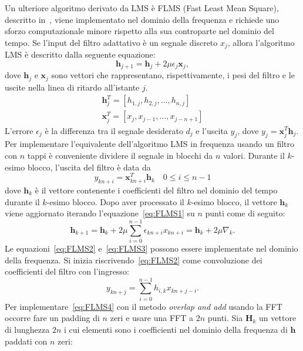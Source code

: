 \documentclass[12pt,a4paper,titlepage]{article}
\begin{document}
Un ulteriore algoritmo derivato da LMS è FLMS (Fast Least Mean Square), descritto in~\cite{Ferrara:FLMS}, viene implementato nel dominio della frequenza e richiede uno sforzo computazionale minore rispetto alla sua controparte nel dominio del tempo. Se l'input del filtro adattativo è un segnale discreto $x_j$, allora l'algoritmo LMS è descritto dalla seguente equazione:
\begin{equation}\label{eq:FLMS1}
\mathbf{h}_{j+1} = \mathbf{h}_j + 2 \mu \epsilon_j \mathbf{x}_j,
\end{equation}
dove $\mathbf{h}_j$ e $\mathbf{x}_j$ sono vettori che rappresentano, rispettivamente, i pesi del filtro e le uscite nella linea di ritardo all'istante $j$.
\begin{equation*}
\begin{split}
\mathbf{h}_j^T = [h_{1,j}, h_{2,j}, \dots, h_{n,j} ]\\
\mathbf{x}_j^T = [x_{j}, x_{j-1}, \dots, x_{j-n+1}]
\end{split} 
\end{equation*}
L'errore $\epsilon_j$ è la differenza tra il segnale desiderato $d_j$ e l'uscita $y_j$, dove $y_j = \mathbf{x}_j^T \mathbf{h}_j$. Per implementare l'equivalente dell'algoritmo LMS in frequenza usando un filtro con $n$ tappi è conveniente dividere il segnale in blocchi da $n$ valori. Durante il $k$-esimo blocco, l'uscita del filtro è data da 
\begin{equation}\label{eq:FLMS2}
y_{kn+i} = \mathbf{x}^T_{kn+i} \mathbf{h}_k	\quad 0 \leq i \leq n-1
\end{equation}
dove $\mathbf{h}_k$ è il vettore contenente i coefficienti del filtro nel dominio del tempo durante il $k$-esimo blocco. Dopo aver processato il $k$-esimo blocco, il vettore $\mathbf{h}_k$ viene aggiornato iterando l'equazione~\eqref{eq:FLMS1} su $n$ punti come di seguito:
\begin{equation}\label{eq:FLMS3}
\mathbf{h}_{k+1} = \mathbf{h}_k + 2\mu\sum_{i=0}^{n-1}\epsilon_{kn+i}x_{kn+i} = \mathbf{h}_k + 2\mu\nabla_k.
\end{equation}
Le equazioni~\eqref{eq:FLMS2} e~\eqref{eq:FLMS3} possono essere implementate nel dominio della frequenza. Si inizia riscrivendo~\eqref{eq:FLMS2} come convoluzione dei coefficienti del filtro con l'ingresso:
\begin{equation}\label{eq:FLMS4}
y_{kn+j} = \sum_{i=0}^{n-1} h_{i,k}x_{kn+j-i}.
\end{equation}
Per implementare~\eqref{eq:FLMS4} con il metodo \textit{overlap and add} usando la FFT occorre fare un padding di $n$ zeri e usare una FFT a $2n$ punti. Sia $\mathbf{H}_k$ un vettore di lunghezza $2n$ i cui elementi sono i coefficienti nel dominio della frequenza di $\mathbf{h}$ paddati con $n$ zeri:
\end{document}
